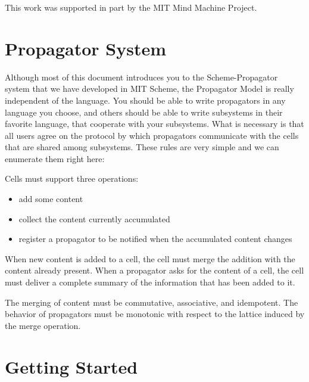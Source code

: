 \documentclass[12pt,letterpaper,english]{article}
\begin{document}
This work was supported in part by the MIT Mind Machine Project.

\tableofcontents


\hypertarget{propagator-system}{}
\section{Propagator System}
\label{propagator-system}

Although most of this document introduces you to the Scheme-Propagator
system that we have developed in MIT Scheme, the Propagator Model is
really independent of the language.  You should be able to write
propagators in any language you choose, and others should be able to
write subsystems in their favorite language, that cooperate with your
subsystems.  What is necessary is that all users agree on the protocol
by which propagators communicate with the cells that are shared among
subsystems.  These rules are very simple and we can enumerate them
right here:

Cells must support three operations:
\begin{itemize}
\item {} 
add some content

\item {} 
collect the content currently accumulated

\item {} 
register a propagator to be notified when the accumulated content changes

\end{itemize}

When new content is added to a cell, the cell must merge the addition
with the content already present.  When a propagator asks for the
content of a cell, the cell must deliver a complete summary of the
information that has been added to it.

The merging of content must be commutative, associative, and
idempotent.  The behavior of propagators must be monotonic with
respect to the lattice induced by the merge operation.



\hypertarget{getting-started}{}
\section{Getting Started}
\label{getting-started}
\end{document}
